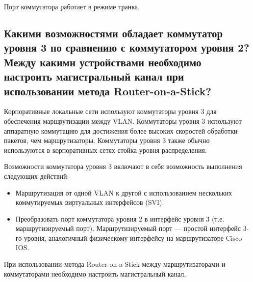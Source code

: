 Порт коммутатора работает в режиме транка.

\subsection{Какими возможностями обладает коммутатор уровня 3 по 
	сравнению с коммутатором уровня 2? Между какими 
	устройствами необходимо настроить магистральный канал при 
	использовании метода Router-on-a-Stick?}

Корпоративные локальные сети используют коммутаторы уровня 3 для 
обеспечения маршрутизации между VLAN. Коммутаторы уровня 3 
используют аппаратную коммутацию для достижения более высоких 
скоростей обработки пакетов, чем маршрутизаторы. Коммутаторы уровня 3 
также обычно используются в корпоративных сетях стойка уровня 
распределения.\par
Возможности коммутатора уровня 3 включают в себя возможность 
выполнения следующих действий:

\begin{itemize}
	\item Маршрутизация от одной VLAN к другой с использованием 
		нескольких коммутируемых виртуальных интерфейсов (SVI).
	\item Преобразовать порт коммутатора уровня 2 в интерфейс уровня 3 
		(т.е. маршрутизируемый порт). Маршрутизируемый порт — 
		простой интерфейс 3-го уровня, аналогичный физическому 
		интерфейсу на маршрутизаторе Cisco IOS.
\end{itemize}

При использовании метода Router-on-a-Stick между маршрутизаторами 
и коммутаторами необходимо настроить магистральный канал.

